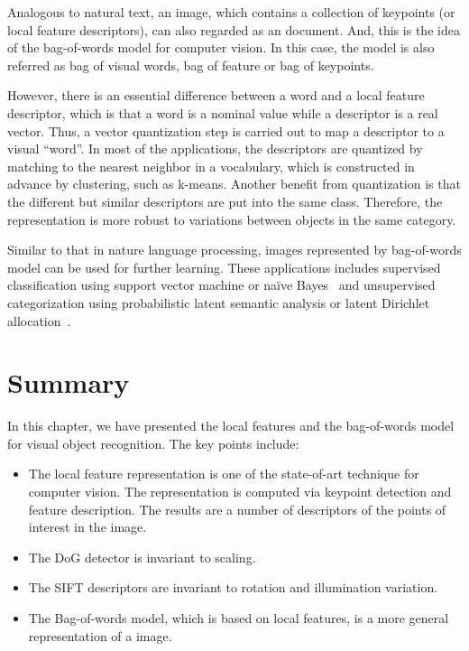 \documentclass[12pt,final,twoside]{report}
\begin{document}
Analogous to natural text, an image, which contains a collection of keypoints (or local feature descriptors), can also regarded as an document. And, this is the idea of the bag-of-words model for computer vision. In this case, the model is also referred as bag of visual words, bag of feature or bag of keypoints. 

However, there is an essential difference between a word and a local feature descriptor, which is that a word is a nominal value while a descriptor is a real vector. Thus, a vector quantization step is carried out to map a descriptor to a visual ``word''. In most of the applications, the descriptors are quantized by matching to the nearest neighbor in a vocabulary, which is constructed in advance by clustering, such as k-means. Another benefit from quantization is that the different but similar descriptors are put into the same class. Therefore, the representation is more robust to variations between objects in the same category.

Similar to that in nature language processing, images represented by bag-of-words model can be used for further learning. These applications includes supervised classification using support vector machine or na\"ive Bayes~\cite{csurka_visual_2004} and unsupervised categorization using probabilistic latent semantic analysis or latent Dirichlet allocation~\cite{sivic_discovering_2005}.

\section{Summary}
In this chapter, we have presented the local features and the bag-of-words model for visual object recognition. The key points include:
\begin{itemize}
  \item The local feature representation is one of the state-of-art technique for computer vision. The representation is computed via keypoint detection and feature description. The results are a number of descriptors of the points of interest in the image. 
  \item The DoG detector is invariant to scaling.
  \item The SIFT descriptors are invariant to rotation and illumination variation.
  \item The Bag-of-words model, which is based on local features, is a more general representation of a image. 
\end{itemize}

\cleardoublepage
\end{document}
